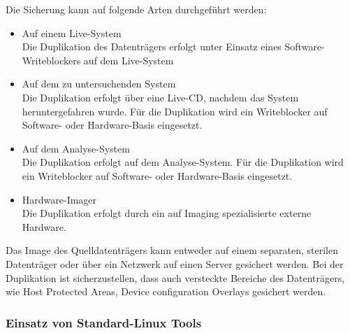 Die Sicherung kann auf folgende Arten durchgeführt werden:
\begin{itemize}
\item Auf einem Live-System\\
Die Duplikation des Datenträgers erfolgt unter Einsatz eines Software-Writeblockers auf dem Live-System
\item Auf dem zu untersuchenden System\\
Die Duplikation erfolgt über eine Live-CD, nachdem das System heruntergefahren wurde. Für die Duplikation wird ein Writeblocker auf Software- oder Hardware-Basis eingesetzt.
\item Auf dem Analyse-System\\
Die Duplikation erfolgt auf dem Analyse-System. Für die Duplikation wird ein Writeblocker auf Software- oder Hardware-Basis eingesetzt.
\item Hardware-Imager\\
Die Duplikation erfolgt durch ein auf Imaging spezialisierte externe Hardware.
\end{itemize}

Das Image des Quelldatenträgers kann entweder auf einem separaten, sterilen Datenträger oder über ein Netzwerk auf einen Server gesichert werden. Bei der Duplikation ist sicherzustellen, dass auch versteckte Bereiche des Datenträgers, wie Host Protected Areas, Device configuration Overlays gesichert werden.

\subsubsection{Einsatz von Standard-Linux Tools}

